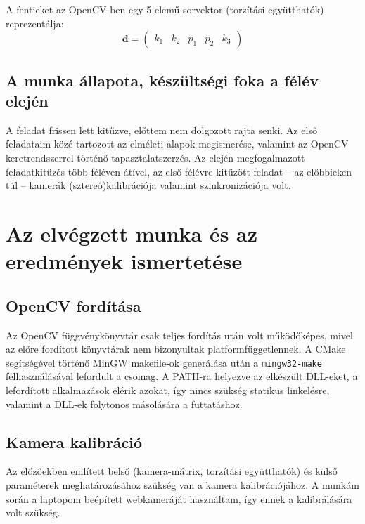 \documentclass[a4paper,oneside]{article}
\begin{document}
A fentieket az OpenCV-ben egy 5 elemű sorvektor (torzítási együtthatók) reprezentálja:
\[\mathbf{d} = \left(\begin{array}{ccccc}k_1 & k_2 & p_1 & p_2 & k_3\end{array}\right)\]

\subsection{A munka állapota, készültségi foka a félév elején}
\label{sec:munka-allap-kesz}

A feladat frissen lett kitűzve, előttem nem dolgozott rajta senki. Az első feladataim közé tartozott az elméleti alapok megismerése, valamint az OpenCV keretrendszerrel történő tapasztalatszerzés. Az elején megfogalmazott feladatkitűzés több féléven átível, az első félévre kitűzött feladat -- az előbbieken túl -- kamerák (sztereó)kalibrációja valamint szinkronizációja volt.

\newpage
\section{Az elvégzett munka és az eredmények ismertetése}
\label{sec:az-elvegzett-munka}

\subsection{OpenCV fordítása}

Az OpenCV függvénykönyvtár csak teljes fordítás után volt működőképes, mivel az előre fordított könyvtárak nem bizonyultak platformfüggetlennek. A CMake \cite{cmake} segítségével történő MinGW makefile-ok generálása után a \texttt{mingw32-make} felhasználásával lefordult a csomag. A PATH-ra helyezve az elkészült DLL-eket, a lefordított alkalmazások elérik azokat, így nincs szükség statikus linkelésre, valamint a DLL-ek folytonos másolására a futtatáshoz.

\subsection{Kamera kalibráció}

Az előzőekben említett belső (kamera-mátrix, torzítási együtthatók) és külső paraméterek meghatározásához szükség van a kamera kalibrációjához. A munkám során a laptopom beépített webkameráját használtam, így ennek a kalibrálására volt szükség.
\end{document}
